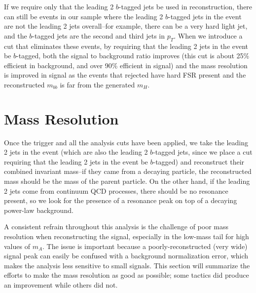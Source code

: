                                                                                                                                     
If we require only that the leading 2 $b$-tagged jets be used in reconstruction, there can                                          
still be events in our sample where the leading 2 $b$-tagged jets in the event are not                                              
the leading 2 jets overall--for example, there can be a very hard light jet, and the $b$-tagged                                     
jets are the second and third jets in $p_T$.  When we introduce a cut that eliminates these events,                                 
by requiring that the leading 2 jets in the event be $b$-tagged, both the signal to background                                      
ratio improves (this cut is about 25\% efficient in background, and over 90\% efficient                                             
in signal) and the mass resolution is improved in signal as the events that rejected have                                           
hard FSR present and the reconstructed $m_{bb}$ is far from the generated $m_H$.    




\section{Mass Resolution}
\label{sec:mass_res}
Once the trigger and all the analysis cuts have been applied, we take the leading 2 jets in the event (which are also the leading 2 $b$-tagged jets, since we place a cut requiring that the leading 2 jets in the event be $b$-tagged) and reconstruct their combined invariant mass--if they came from a decaying particle, the reconstructed mass should be the mass of the parent particle.  On the other hand, if the leading 2 jets come from continuum QCD processes, there should be no resonance present, so we look for the presence of a resonance peak on top of a decaying power-law background.


A consistent refrain throughout this analysis is the challenge of poor mass resolution when reconstructing
the signal, especially in the low-mass tail for high values of $m_A$. The issue is important because a poorly-reconstructed (very wide)
signal peak can easily be confused with a background normalization error, which makes the analysis less
sensitive to small signals. This section will summarize the efforts to make the mass resolution as good
as possible; some tactics did produce an improvement while others did not.

